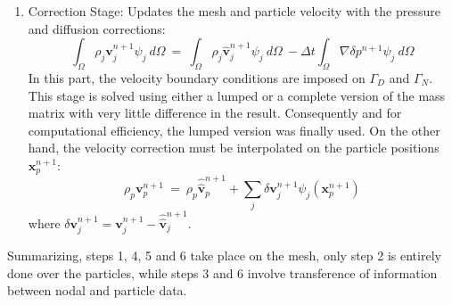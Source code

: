 \begin{enumerate}
 \item Correction Stage: Updates the mesh and particle velocity with the pressure and diffusion corrections:
 \begin{equation}\label{Step6a}
  \int_{\Omega} \rho_j \mathbf{v}_j^{n+1}\psi_j\ d\Omega \ = \ \int_{\Omega} \rho_j  \widehat{\mathbf{v}}_j^{n+1}\psi_j\ d\Omega\ - \Delta t \int_{\Omega}  \nabla \delta p^{n+1}\psi_j\ d\Omega
 \end{equation}
 In this part, the velocity boundary conditions are imposed on $\Gamma_D$ and $\Gamma_N$. This stage is solved using either a lumped or a complete version of the mass matrix with very little difference in the result. Consequently and for computational efficiency, the lumped version was finally used. On the other hand, the velocity correction must be interpolated on the particle positions $\mathbf{x}_{p}^{n+1}$:
  \begin{equation}\label{Step6b}
  \rho_p \mathbf{v}_p^{n+1}\  = \ \rho_p \widehat{\widehat{\mathbf{v}}}_p^{n+1} + \sum_{j} \delta \mathbf{v}_j^{n+1} \psi_j(\mathbf{x}_{p}^{n+1})
  \end{equation}
  where $\delta \mathbf{v}_j^{n+1} = \mathbf{v}_j^{n+1}-\widehat{\widehat{\mathbf{v}}}_j^{n+1}$.

\end{enumerate}

Summarizing, steps 1, 4, 5 and 6 take place on the mesh, only step 2 is entirely done over the particles, while steps 3 and 6 involve transference of information between nodal and particle data.
